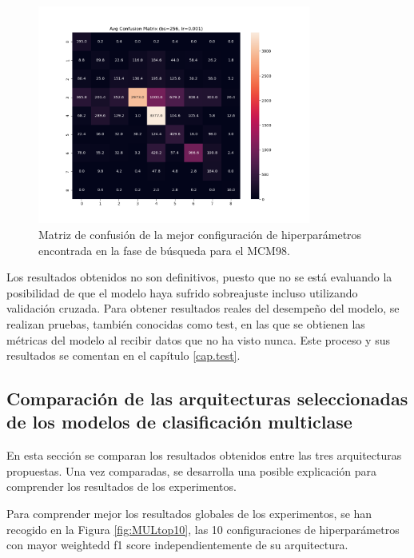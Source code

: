 \begin{figure}[H]
    \centering
    \includegraphics[width=0.8\textwidth]{./img/modelo/matrices_confusion/MC_ENT_MCM98.png}
    \caption{Matriz de confusión de la mejor configuración de hiperparámetros encontrada en la fase de búsqueda para el MCM98.}
    \label{fig:MC_ENT_MCM98}
\end{figure}


Los resultados obtenidos no son definitivos, puesto que no se está evaluando la posibilidad de que el modelo haya sufrido sobreajuste incluso utilizando validación cruzada. Para obtener resultados reales del desempeño del modelo, se realizan pruebas, también conocidas como test, en las que se obtienen las métricas del modelo al recibir datos que no ha visto nunca. Este proceso y sus resultados se comentan en el capítulo \ref{cap.test}.


\subsection{Comparación de las arquitecturas seleccionadas de los modelos de clasificación multiclase}\label{sec:comp.MUL}
En esta sección se comparan los resultados obtenidos entre las tres arquitecturas propuestas. Una vez comparadas, se desarrolla una posible explicación para comprender los resultados de los experimentos.

Para comprender mejor los resultados globales de los experimentos, se han recogido en la Figura \ref{fig:MULtop10}, las 10 configuraciones de hiperparámetros con mayor weightedd f1 score independientemente de su arquitectura.

